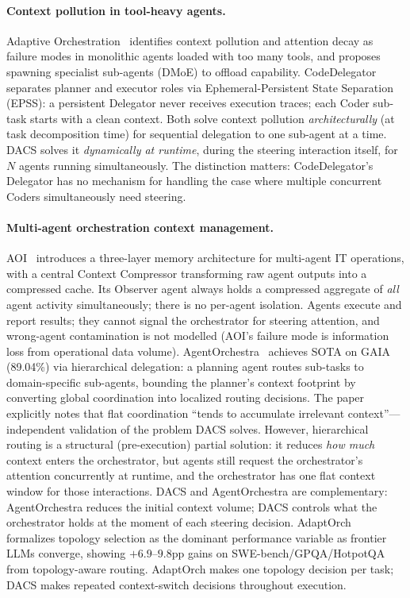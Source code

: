 \documentclass{article}
\begin{document}
\paragraph{Context pollution in tool-heavy agents.}
Adaptive Orchestration~\citep{adaptorch2025} identifies context pollution
and attention decay as failure modes in monolithic agents loaded with too
many tools, and proposes spawning specialist sub-agents (DMoE) to offload
capability.
CodeDelegator~\citep{codedelegator2025} separates planner and executor
roles via Ephemeral-Persistent State Separation (EPSS): a persistent
Delegator never receives execution traces; each Coder sub-task starts with
a clean context.
Both solve context pollution \emph{architecturally} (at task decomposition
time) for sequential delegation to one sub-agent at a time.
DACS solves it \emph{dynamically at runtime}, during the steering
interaction itself, for $N$ agents running simultaneously.
The distinction matters: CodeDelegator's Delegator has no mechanism for
handling the case where multiple concurrent Coders simultaneously need
steering.

\paragraph{Multi-agent orchestration context management.}
AOI~\citep{aoi2024} introduces a three-layer memory architecture for
multi-agent IT operations, with a central Context Compressor transforming
raw agent outputs into a compressed cache.
Its Observer agent always holds a compressed aggregate of \emph{all}
agent activity simultaneously; there is no per-agent isolation.
Agents execute and report results; they cannot signal the orchestrator
for steering attention, and wrong-agent contamination is not modelled
(AOI's failure mode is information loss from operational data volume).
AgentOrchestra~\citep{agentorchestra2025} achieves SOTA on GAIA (89.04\%)
via hierarchical delegation: a planning agent routes sub-tasks to
domain-specific sub-agents, bounding the planner's context footprint by
converting global coordination into localized routing decisions.
The paper explicitly notes that flat coordination ``tends to accumulate
irrelevant context''—independent validation of the problem DACS solves.
However, hierarchical routing is a structural (pre-execution) partial
solution: it reduces \emph{how much} context enters the orchestrator, but
agents still request the orchestrator's attention concurrently at runtime,
and the orchestrator has one flat context window for those interactions.
DACS and AgentOrchestra are complementary: AgentOrchestra reduces the
initial context volume; DACS controls what the orchestrator holds at the
moment of each steering decision.
AdaptOrch~\citep{adaptorch2025b} formalizes topology selection as the
dominant performance variable as frontier LLMs converge, showing
$+6.9$--$9.8$pp gains on SWE-bench/GPQA/HotpotQA from topology-aware
routing.
AdaptOrch makes one topology decision per task; DACS makes repeated
context-switch decisions throughout execution.
\end{document}

